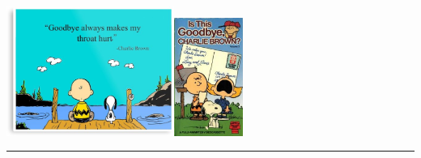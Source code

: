 \documentclass[
]{article}
\begin{document}
\includegraphics[width=0.41\textwidth,height=\textheight]{figures/charlie_brown_1.jpg}\includegraphics[width=0.17\textwidth,height=\textheight]{figures/charlie_brown_2.jpg}

\begin{center}\rule{0.5\linewidth}{0.5pt}\end{center}
\end{document}
